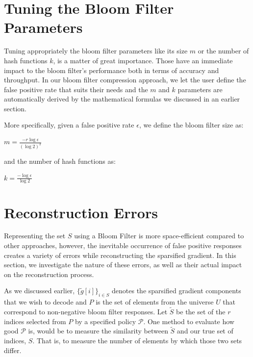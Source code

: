     \section{Tuning the Bloom Filter Parameters}

    Tuning appropriately the bloom filter parameters like its size $m$ or the number of hash functions $k$, is a matter of great importance.
    Those have an immediate impact to the bloom filter's performance both in terms of accuracy and throughput.
    In our bloom filter compression approach, we let the user define the false positive rate that suits their needs and the $m$ and $k$ parameters are automatically derived by the mathematical formulas \cite{5751342} we discussed in an earlier section.
    
    More specifically, given a false positive rate $\epsilon$, we define the bloom filter size as:
    \begin{flushleft}
    \centering
    \setlength{\parindent}{5ex}
    $m=\frac{-r\log\epsilon}{(\log 2)^2}$
    \end{flushleft} 
    and the number of hash functions as:
    \begin{flushleft}
    \centering
    \setlength{\parindent}{5ex}
    $k=\frac{-\log\epsilon}{\log 2}$
    \end{flushleft}
    
    \section{Reconstruction Errors}
            Representing the set $S$ using a Bloom Filter is more space-efficient compared to other approaches, however, the inevitable occurrence of false positive responses creates a variety of errors while reconstructing the sparsified gradient. In this section, we investigate the nature of these errors, as well as their actual impact on the reconstruction process.
            
            As we discussed earlier, $\{\tilde{g}[i]\}_{i\in S}$ denotes the sparsified gradient components that we wish to decode and $P$ is the set of elements from the universe $U$ that correspond to non-negative bloom filter responses.
            Let $\tilde{S}$ be the set of the $r$ indices selected from $P$ by a specified policy 
            $\mathcal{P}$. 
            One method to evaluate how good $\mathcal{P}$ is, would be to measure the similarity between $\tilde{S}$ and our true set of indices, $S$. 
            That is, to measure the number of elements by which those two sets differ. 
        
